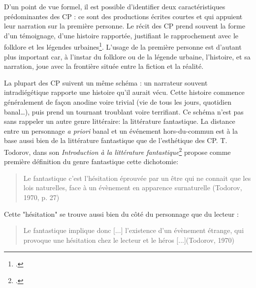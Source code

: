 \documentclass[12pt,a4paper,oneside,titlepage]{book} %
\begin{document}
\par
D’un point de vue formel, il est possible d’identifier deux caractéristiques prédominantes des CP : ce sont des productions écrites courtes et qui appuient leur narration sur la première personne. Le récit des CP prend souvent la forme d’un témoignage, d’une histoire rapportée, justifiant le rapprochement avec le folklore et les légendes urbaines\footcite{blank_slender_2018}. L’usage de la première personne est d’autant plus important car, à l’instar du folklore ou de la légende urbaine, l’histoire, et sa narration, joue avec la frontière située entre la fiction et la réalité. 
\par
La plupart des CP suivent un même schéma : un narrateur souvent intradiégétique rapporte une histoire qu’il aurait vécu. Cette histoire commence généralement de façon anodine voire trivial (vie de tous les jours, quotidien banal…), puis prend un tournant troublant voire terrifiant. 
Ce schéma n’est pas sans rappeler un autre genre littéraire: la littérature fantastique. La distance entre un personnage \emph{a priori} banal et un événement hors-du-commun est à la base aussi bien de la littérature fantastique que de l’esthétique des CP. \newline
T. Todorov, dans son \emph{Introduction à la littérature fantastique}\footcite{todorov_introductin_1992} propose comme première définition du genre fantastique cette dichotomie: 

	\begin{quotation}
Le fantastique c’est l’hésitation éprouvée par un être qui ne connait que les lois naturelles, face à un évènement en apparence surnaturelle (Todorov, 1970, p. 27)\newline
	\end{quotation}

Cette "hésitation" se trouve aussi bien du côté du personnage que du lecteur : 
\begin{quotation}
	Le fantastique implique donc [...] l’existence d’un évènement étrange, qui provoque une hésitation chez le lecteur et le héros [...](Todorov, 1970)
\end{quotation}
\end{document}
